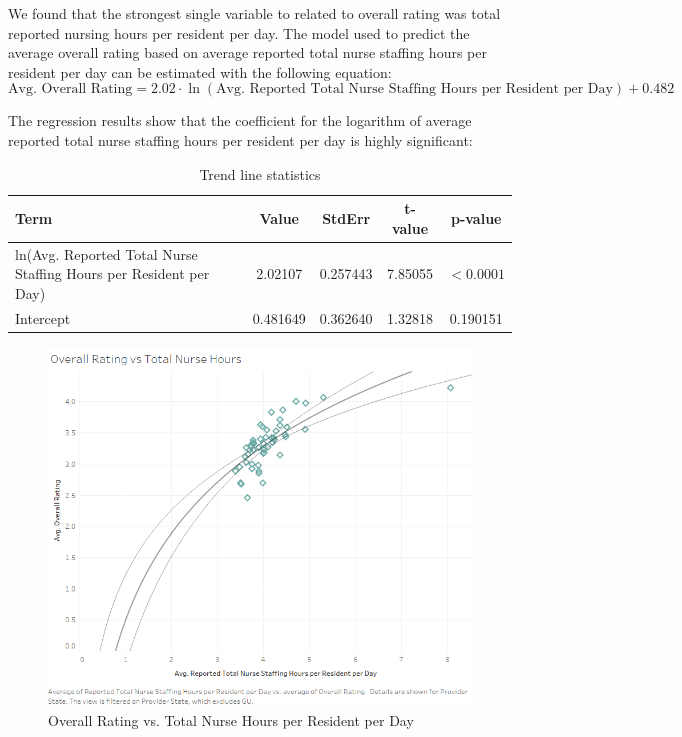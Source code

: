 \documentclass{article}
\theoremstyle{mytheoremstyle}
\theoremstyle{mytheoremstyle}
\theoremstyle{myproblemstyle}
\begin{document}
\pagebreak

We found that the strongest single variable to related to overall rating was total reported nursing hours per resident per day. The model used to predict the average overall rating based on average reported total nurse staffing hours per resident per day can be estimated with the following equation:
\begin{equation}
    \text{Avg. Overall Rating} = 2.02 \cdot \ln(\text{Avg. Reported Total Nurse Staffing Hours per Resident per Day}) + 0.482
\end{equation}

The regression results show that the coefficient for the logarithm of average reported total nurse staffing hours per resident per day is highly significant:

\begin{table}[ht]
\centering
\caption{Trend line statistics}
\begin{tabular}{@{}lcccc@{}}
\toprule
Term & Value & StdErr & t-value & p-value \\ 
\midrule
ln(Avg. Reported Total Nurse Staffing Hours per Resident per Day) & 2.02107 & 0.257443 & 7.85055 & \(< 0.0001\) \\
Intercept & 0.481649 & 0.362640 & 1.32818 & 0.190151 \\
\bottomrule
\end{tabular}
\end{table}

\begin{figure}[htbp]
\centering
\includegraphics[width=0.7\linewidth]{Images/Overall Rating vs Total Nurse Hours.png}
\caption{Overall Rating vs. Total Nurse Hours per Resident per Day}
\label{Rating by state}
\end{figure}
\end{document}
